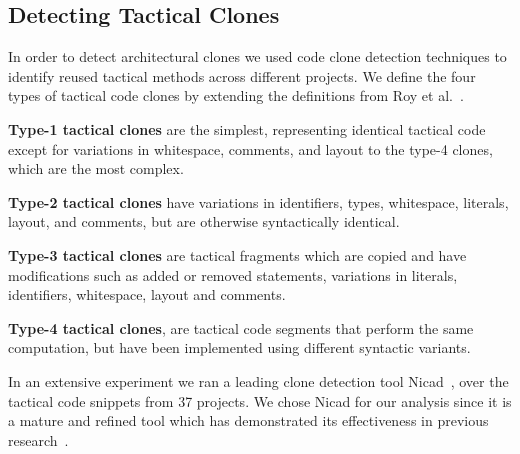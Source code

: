 


\subsection{Detecting Tactical Clones}
In order to detect architectural clones we used code clone detection techniques to identify reused tactical methods across different projects. We define the four types of tactical code clones by extending the definitions from Roy et al.~\cite{Roy:2008:NAD:1437898.1438600}.


\textbf{Type-1 tactical clones} are the simplest, representing identical tactical code except for variations in whitespace, comments, and layout to the type-4 clones, which are the most complex.


\textbf{Type-2 tactical clones} have variations in identifiers, types, whitespace, literals, layout, and comments, but are otherwise syntactically identical.

\textbf{Type-3 tactical clones} are tactical fragments which are copied and have modifications such as added or removed statements, variations in literals, identifiers, whitespace, layout and comments.


\textbf{Type-4 tactical clones}, are tactical code segments that perform the same computation, but have been implemented using different syntactic variants. 




In an extensive experiment we ran a leading clone detection tool Nicad~\cite{Roy:2008:NAD:1437898.1438600}, over the tactical code snippets from 37 projects. We chose Nicad for our analysis since it is a mature and refined tool which has demonstrated its effectiveness in previous research~\cite{roy2008empirical}.

